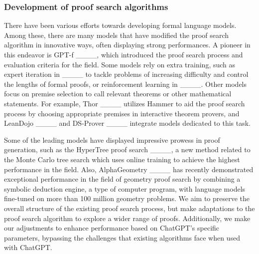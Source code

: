 \subsubsection{Development of proof search algorithms}
There have been various efforts towards developing formal language models. Among these, there are many models that have modified the proof search algorithm in innovative ways, often displaying strong performances. A pioneer in this endeavor is GPT-f ____, which introduced the proof search process and evaluation criteria for the field. 
Some models rely on extra training, such as expert iteration in ____ to tackle problems of increasing difficulty and control the lengths of formal proofs, or reinforcement learning in ____.
Other models focus on premise selection to call relevant theorems or other mathematical statements. For example, Thor ____ utilizes Hammer to aid the proof search process by choosing appropriate premises in interactive theorem provers, and LeanDojo ____ and DS-Prover ____ integrate models dedicated to this task.

Some of the leading models have displayed impressive prowess in proof generation, such as the HyperTree proof search ____, a new method related to the Monte Carlo tree search which uses online training to achieve the highest performance in the field.
Also, AlphaGeometry ____ has recently demonstrated exceptional performance in the field of geometry proof search by combining a symbolic deduction engine, a type of computer program, with language models fine-tuned on more than 100 million geometry problems. 
We aim to preserve the overall structure of the existing proof search process, but make adaptations to the proof search algorithm to explore a wider range of proofs. Additionally, we make our adjustments to enhance performance based on ChatGPT's specific parameters, bypassing the challenges that existing algorithms face when used with ChatGPT.